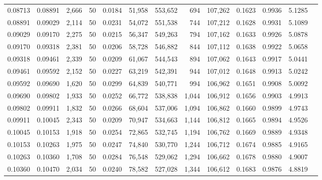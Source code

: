 \begin{tabular}{rrrrrrrrrrrrr}
0.08713 & 0.08891 & 2,666 &  50 &                                     0.0184 &  51,958 & 553,652 &     694 & 107,262 & 0.1623 & 0.9936 & 5.1285 \\
0.08891 & 0.09029 & 2,114 &  50 &                                     0.0231 &  54,072 & 551,538 &     744 & 107,212 & 0.1628 & 0.9931 & 5.1089 \\
0.09029 & 0.09170 & 2,275 &  50 &                                     0.0215 &  56,347 & 549,263 &     794 & 107,162 & 0.1633 & 0.9926 & 5.0878 \\
0.09170 & 0.09318 & 2,381 &  50 &                                     0.0206 &  58,728 & 546,882 &     844 & 107,112 & 0.1638 & 0.9922 & 5.0658 \\
0.09318 & 0.09461 & 2,339 &  50 &                                     0.0209 &  61,067 & 544,543 &     894 & 107,062 & 0.1643 & 0.9917 & 5.0441 \\
0.09461 & 0.09592 & 2,152 &  50 &                                     0.0227 &  63,219 & 542,391 &     944 & 107,012 & 0.1648 & 0.9913 & 5.0242 \\
0.09592 & 0.09690 & 1,620 &  50 &                                     0.0299 &  64,839 & 540,771 &     994 & 106,962 & 0.1651 & 0.9908 & 5.0092 \\
0.09690 & 0.09802 & 1,933 &  50 &                                     0.0252 &  66,772 & 538,838 &   1,044 & 106,912 & 0.1656 & 0.9903 & 4.9913 \\
0.09802 & 0.09911 & 1,832 &  50 &                                     0.0266 &  68,604 & 537,006 &   1,094 & 106,862 & 0.1660 & 0.9899 & 4.9743 \\
0.09911 & 0.10045 & 2,343 &  50 &                                     0.0209 &  70,947 & 534,663 &   1,144 & 106,812 & 0.1665 & 0.9894 & 4.9526 \\
0.10045 & 0.10153 & 1,918 &  50 &                                     0.0254 &  72,865 & 532,745 &   1,194 & 106,762 & 0.1669 & 0.9889 & 4.9348 \\
0.10153 & 0.10263 & 1,975 &  50 &                                     0.0247 &  74,840 & 530,770 &   1,244 & 106,712 & 0.1674 & 0.9885 & 4.9165 \\
0.10263 & 0.10360 & 1,708 &  50 &                                     0.0284 &  76,548 & 529,062 &   1,294 & 106,662 & 0.1678 & 0.9880 & 4.9007 \\
0.10360 & 0.10470 & 2,034 &  50 &                                     0.0240 &  78,582 & 527,028 &   1,344 & 106,612 & 0.1683 & 0.9876 & 4.8819 \\

\end{tabular}
